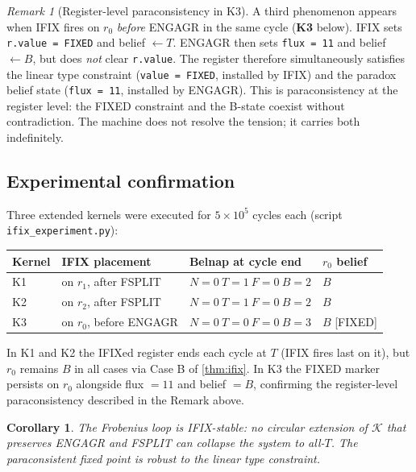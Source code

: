 \documentclass[12pt,a4paper]{article}
\newtheorem{corollary}[theorem]{Corollary}
\theoremstyle{definition}
\theoremstyle{remark}
\newtheorem{remark}{Remark}
\begin{document}
\begin{remark}[Register-level paraconsistency in K3]
A third phenomenon appears when IFIX fires on $r_0$ \emph{before} ENGAGR in
the same cycle (\textbf{K3} below).  IFIX sets \texttt{r.value = FIXED} and
belief $\leftarrow T$.  ENGAGR then sets \texttt{flux = 11} and belief
$\leftarrow B$, but does \emph{not} clear \texttt{r.value}.  The register
therefore simultaneously satisfies the linear type constraint
(\texttt{value = FIXED}, installed by IFIX) and the paradox belief state
(\texttt{flux = 11}, installed by ENGAGR).  This is paraconsistency at the
register level: the FIXED constraint and the B-state coexist without
contradiction.  The machine does not resolve the tension; it carries both
indefinitely.
\end{remark}

\subsection*{Experimental confirmation}

Three extended kernels were executed for $5 \times 10^5$ cycles each
(script \texttt{ifix\_experiment.py}):

\begin{center}
\begin{tabular}{llll}
\toprule
Kernel & IFIX placement & Belnap at cycle end & $r_0$ belief \\
\midrule
K1 & on $r_1$, after FSPLIT & $N{=}0\ T{=}1\ F{=}0\ B{=}2$ & $B$ \\
K2 & on $r_2$, after FSPLIT & $N{=}0\ T{=}1\ F{=}0\ B{=}2$ & $B$ \\
K3 & on $r_0$, before ENGAGR & $N{=}0\ T{=}0\ F{=}0\ B{=}3$ & $B$ [FIXED] \\
\bottomrule
\end{tabular}
\end{center}

In K1 and K2 the IFIXed register ends each cycle at $T$ (IFIX fires last on
it), but $r_0$ remains $B$ in all cases via Case B of \cref{thm:ifix}.
In K3 the FIXED marker persists on $r_0$ alongside flux $= 11$ and belief
$= B$, confirming the register-level paraconsistency described in the Remark
above.

\begin{corollary}
The Frobenius loop is \emph{IFIX-stable}: no circular extension of
$\mathcal{K}$ that preserves ENGAGR and FSPLIT can collapse the system to
all-$T$.  The paraconsistent fixed point is robust to the linear type
constraint.
\end{corollary}
\end{document}
